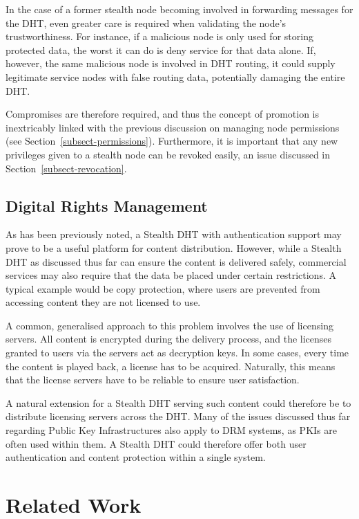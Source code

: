 \documentclass{elsart3p}
\begin{document}
In the case of a former stealth node becoming involved in forwarding
messages for the DHT, even greater care is required when validating
the node's trustworthiness. For instance, if a malicious node is
only used for storing protected data, the worst it can do is deny
service for that data alone. If, however, the same malicious node is
involved in DHT routing, it could supply legitimate service nodes
with false routing data, potentially damaging the entire DHT.

Compromises are therefore required, and thus the concept of
promotion is inextricably linked with the previous discussion on
managing node permissions (see Section~\ref{subsect-permissions}).
Furthermore, it is important that any new privileges given to a
stealth node can be revoked easily, an issue discussed in
Section~\ref{subsect-revocation}.

\subsection{Digital Rights Management}
As has been previously noted, a Stealth DHT with authentication
support may prove to be a useful platform for content distribution.
However, while a Stealth DHT as discussed thus far can ensure the
content is delivered safely, commercial services may also require
that the data be placed under certain restrictions. A typical
example would be copy protection, where users are prevented from
accessing content they are not licensed to use.

A common, generalised approach to this problem involves the use of
licensing servers. All content is encrypted during the delivery
process, and the licenses granted to users via the servers act as
decryption keys. In some cases, every time the content is played
back, a license has to be acquired. Naturally, this means that the
license servers have to be reliable to ensure user satisfaction.

A natural extension for a Stealth DHT serving such content could
therefore be to distribute licensing servers across the DHT. Many of
the issues discussed thus far regarding Public Key Infrastructures
also apply to DRM systems, as PKIs are often used within them. A
Stealth DHT could therefore offer both user authentication and
content protection within a single system.

\section{Related Work}
\label{sect-related}
\end{document}
